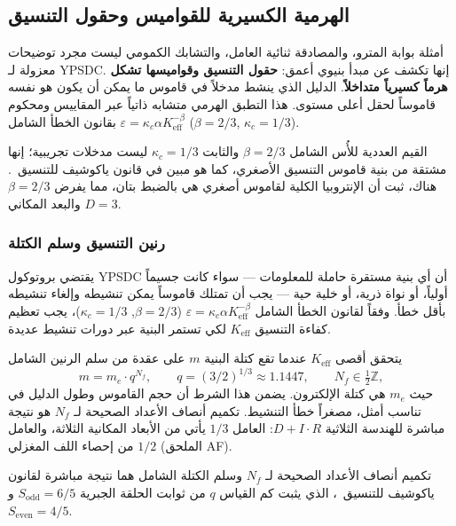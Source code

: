 \documentclass[12pt,a4paper]{article}
\theoremstyle{remark}
\begin{document}
	\subsection{الهرمية الكسيرية للقواميس وحقول التنسيق}
	\label{subsec:fractal-hierarchy}
	
	أمثلة بوابة المترو، والمصادقة ثنائية العامل، والتشابك الكمومي ليست مجرد توضيحات معزولة لـ YPSDC. إنها تكشف عن مبدأ بنيوي أعمق: \textbf{حقول التنسيق وقواميسها تشكل هرماً كسيرياً متداخلاً}. الدليل الذي ينشط مدخلاً في قاموس ما يمكن أن يكون هو نفسه قاموساً لحقل أعلى مستوى. هذا التطبق الهرمي متشابه ذاتياً عبر المقاييس ومحكوم بقانون الخطأ الشامل \(\varepsilon = \kappa_c \alpha K_{\mathrm{eff}}^{-\beta}\) (\(\beta=2/3\), \(\kappa_c=1/3\)).
	
	القيم العددية للأُس الشامل \(\beta = 2/3\) والثابت \(\kappa_c = 1/3\) ليست مدخلات تجريبية؛ إنها مشتقة من بنية قاموس التنسيق الأصغري، كما هو مبين في قانون ياكوشيف للتنسيق~\cite{YakushevLaw2026}. هناك، ثبت أن الإنتروبيا الكلية لقاموس أصغري هي بالضبط بتان، مما يفرض \(\beta = 2/3\) والبعد المكاني \(D = 3\).
	
	\subsubsection{رنين التنسيق وسلم الكتلة}
	
	يقتضي بروتوكول YPSDC أن أي بنية مستقرة حاملة للمعلومات — سواء كانت جسيماً أولياً، أو نواة ذرية، أو خلية حية — يجب أن تمتلك قاموساً يمكن تنشيطه وإلغاء تنشيطه بأقل خطأ. وفقاً لقانون الخطأ الشامل \(\varepsilon = \kappa_c\alpha K_{\mathrm{eff}}^{-\beta}\) (\(\beta = 2/3\), \(\kappa_c = 1/3\))، يجب تعظيم كفاءة التنسيق \(K_{\mathrm{eff}}\) لكي تستمر البنية عبر دورات تنشيط عديدة.
	
	يتحقق أقصى \(K_{\mathrm{eff}}\) عندما تقع كتلة البنية \(m\) على عقدة من سلم الرنين الشامل
	\begin{equation}
		m = m_e \cdot q^{N_f}, \qquad
		q = (3/2)^{1/3} \approx 1.1447, \qquad N_f \in \tfrac{1}{2}\mathbb{Z},
		\label{eq:mass-ladder}
	\end{equation}
	حيث \(m_e\) هي كتلة الإلكترون. يضمن هذا الشرط أن حجم القاموس وطول الدليل في تناسب أمثل، مصغراً خطأ التنشيط. تكميم أنصاف الأعداد الصحيحة لـ \(N_f\) هو نتيجة مباشرة للهندسة الثلاثية \(D+I\!\cdot\!R\): العامل \(1/3\) يأتي من الأبعاد المكانية الثلاثة، والعامل \(1/2\) من إحصاء اللف المغزلي (الملحق AF).
	
	تكميم أنصاف الأعداد الصحيحة لـ \(N_f\) وسلم الكتلة الشامل هما نتيجة مباشرة لقانون ياكوشيف للتنسيق~\cite{YakushevLaw2026}، الذي يثبت كم القياس \(q\) من ثوابت الحلقة الجبرية \(S_{\mathrm{odd}} = 6/5\) و\(S_{\mathrm{even}} = 4/5\).
	
\end{document}
